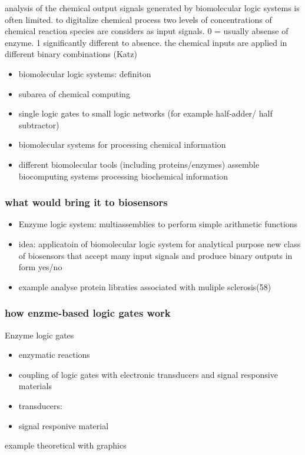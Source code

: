 \documentclass[runningheads]{llncs}
\begin{document}
	analysis of the chemical output signals generated by biomolecular logic systems is often limited.
	to digitalize chemical process two levels of concentrations of chemical reaction species are considers as input signals. 0 = usually absense of enzyme. 1 significantly different to absence. the chemical inputs are applied in different binary combinations (Katz) 
		\begin{itemize}
			\item biomolecular logic systems: definiton
			\item subarea of chemical computing 
			\item single logic gates to small logic networks (for example half-adder/ half subtractor)
			\item biomolecular systems for processing chemical information
			\item different biomolecular tools (including proteins/enzymes) assemble biocomputing systems processing biochemical information \\	
		\end{itemize}
	\subsubsection{what would bring it to biosensors}	
	\begin{itemize}	
		\item Enzyme logic system: multiassemblies to perform simple arithmetic functions
		\item idea: applicatoin of biomolecular logic system for analytical purpose new class of biosensors that accept many input signals and produce binary outputs in form yes/no 
		\item example analyse protein libraties associated with muliple sclerosis(58)
	\end{itemize}

	\subsubsection{how enzme-based logic gates work}	
Enzyme logic gates
\begin{itemize}
	\item enzymatic reactions
	\item coupling of logic gates with electronic transducers and signal responsive materials
	\item transducers:
	\item signal responive material
	
\end{itemize}
example theoretical with graphics
\end{document}
